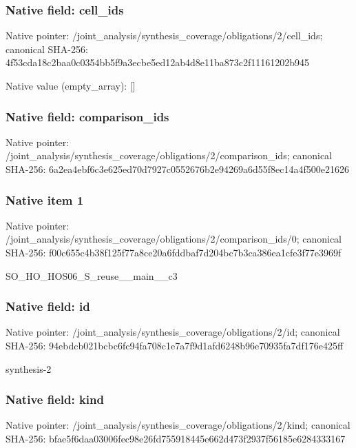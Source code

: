 \documentclass[10pt,a4paper]{article}
\begin{document}
\subsubsection{Native field: cell\_\allowbreak{}ids}
Native pointer: /joint\_\allowbreak{}analysis/synthesis\_\allowbreak{}coverage/obligations/2/cell\_\allowbreak{}ids; canonical SHA-256: 4f53cda18c2baa0c0354bb5f9a3ecbe5ed12ab4d8e11ba873c2f11161202b945

Native value (empty\_\allowbreak{}array): []

\subsubsection{Native field: comparison\_\allowbreak{}ids}
Native pointer: /joint\_\allowbreak{}analysis/synthesis\_\allowbreak{}coverage/obligations/2/comparison\_\allowbreak{}ids; canonical SHA-256: 6a2ea4ebf6c3e625ed70d7927c0552676b2e94269a6d55f8ec14a4f500e21626

\subsubsection{Native item 1}
Native pointer: /joint\_\allowbreak{}analysis/synthesis\_\allowbreak{}coverage/obligations/2/comparison\_\allowbreak{}ids/0; canonical SHA-256: f00c655c4b38f125f77a8ce20a6fddbaf7d204bc7b3ca386ea1cfe3f77e3969f

\begingroup\raggedright\sloppy SO\_\allowbreak{}HO\_\allowbreak{}HOS06\_\allowbreak{}S\_\allowbreak{}reuse\_\allowbreak{}\_\allowbreak{}main\_\allowbreak{}\_\allowbreak{}c3\par\endgroup

\subsubsection{Native field: id}
Native pointer: /joint\_\allowbreak{}analysis/synthesis\_\allowbreak{}coverage/obligations/2/id; canonical SHA-256: 94ebdcb021bcbc6fc94fa708c1e7a7f9d1afd6248b96e70935fa7df176e425ff

\begingroup\raggedright\sloppy synthesis-2\par\endgroup

\subsubsection{Native field: kind}
Native pointer: /joint\_\allowbreak{}analysis/synthesis\_\allowbreak{}coverage/obligations/2/kind; canonical SHA-256: bfae5f6daa03006fec98e26fd755918445e662d473f2937f56185e6284333167
\end{document}
